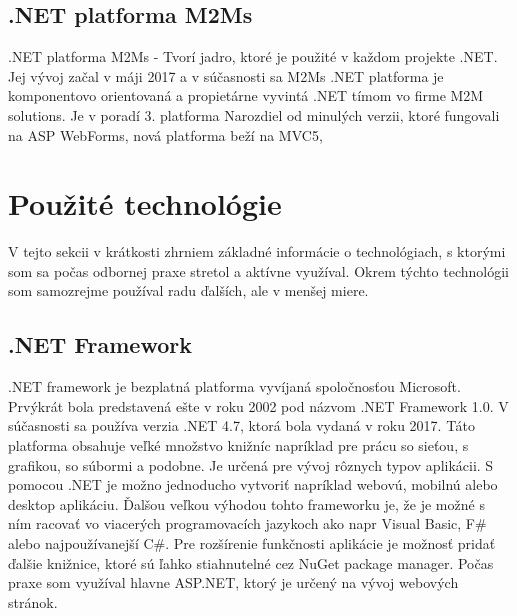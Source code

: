 \documentclass[11pt, oneside]{report}
\begin{document}
\section{.NET platforma M2Ms}
.NET platforma M2Ms - Tvorí jadro, ktoré je použité v každom projekte .NET. Jej vývoj začal v máji 2017 a v súčasnosti sa  M2Ms .NET platforma je komponentovo orientovaná a propietárne vyvintá .NET tímom  vo  firme M2M solutions. Je v poradí 3. platforma Narozdiel od minulých verzii, ktoré fungovali na ASP WebForms, nová platforma beží na MVC5,

\chapter{Použité technológie}
V tejto sekcii v krátkosti zhrniem základné informácie o technológiach, s ktorými som sa počas odbornej praxe stretol a aktívne využíval. Okrem týchto  technológii som samozrejme používal radu ďalších, ale v menšej miere.

\section{.NET Framework}

.NET framework \cite{net} je bezplatná platforma vyvíjaná spoločnosťou Microsoft. Prvýkrát bola predstavená ešte v roku 2002 pod názvom .NET Framework 1.0. V súčasnosti sa používa verzia .NET 4.7, ktorá bola vydaná v roku 2017. Táto platforma obsahuje veľké množstvo knižníc napríklad pre prácu   so sieťou, s grafikou,  so súbormi a podobne. Je určená pre vývoj rôznych typov aplikácii. S pomocou .NET  je možno jednoducho vytvoriť napríklad webovú, mobilnú alebo desktop aplikáciu. Ďalšou veľkou výhodou tohto frameworku je, že je možné  s ním racovať vo viacerých programovacích jazykoch ako napr Visual Basic, F\# alebo najpoužívanejší C\#. Pre rozšírenie funkčnosti aplikácie je možnosť pridať ďalšie knižnice, ktoré sú ľahko stiahnutelné cez NuGet package manager. Počas praxe som využíval hlavne ASP.NET, ktorý je určený na vývoj webových stránok.
\end{document}
